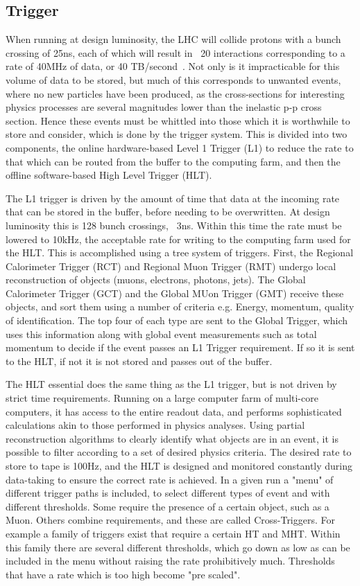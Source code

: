 \subsection{Trigger}
\label{sec:detrig}
When running at design luminosity, the LHC will collide protons with a bunch crossing of 25ns, each of which will result in ~20 interactions corresponding to a rate of 40MHz of data, or 40 TB/second~\cite{TRIGTDR}. Not only is it impracticable for this volume of data to be stored, but much of this corresponds to unwanted events, where no new particles have been produced, as the cross-sections for interesting physics processes are several magnitudes lower than the inelastic p-p cross section. Hence these events must be whittled into those which it is worthwhile to store and consider, which is done by the trigger system. This is divided into two components, the online hardware-based Level 1 Trigger (L1) to reduce the rate to that which can be routed from the buffer to the computing farm, and then the offline software-based High Level Trigger (HLT). 

The L1 trigger is driven by the amount of time that data at the incoming rate that can be stored in the buffer, before needing to be overwritten. At design luminosity this is 128 bunch crossings, ~3ns. Within this time the rate must be lowered to 10kHz, the acceptable rate for writing to the computing farm used for the HLT. This is accomplished using a tree system of triggers. First, the Regional Calorimeter Trigger (RCT) and Regional Muon Trigger (RMT) undergo local reconstruction of objects (muons, electrons, photons, jets). The Global Calorimeter Trigger (GCT) and the Global MUon Trigger (GMT) receive these objects, and sort them using a number of criteria e.g. Energy, momentum, quality of identification. The top four of each type are sent to the Global Trigger, which uses this information along with global event measurements such as total momentum to decide if the event passes an L1 Trigger requirement. If so it is sent to the HLT, if not it is not stored and passes out of the buffer. 

The HLT essential does the same thing as the L1 trigger, but is not driven by strict time requirements. Running on a large computer farm of multi-core computers, it has access to the entire readout data, and performs sophisticated calculations akin to those performed in physics analyses. Using partial reconstruction algorithms to clearly identify what objects are in an event, it is possible to filter according to a set of desired physics criteria.  The desired rate to store to tape is 100Hz, and the HLT is designed and monitored constantly during data-taking to ensure the correct rate is achieved. In a given run a "menu" of different trigger paths is included, to select different types of event and with different thresholds. Some require the presence of a certain object, such as a Muon. Others combine requirements, and these are called Cross-Triggers. For example a family of triggers exist that require a certain HT and MHT. Within this family there are several different thresholds, which go down as low as can be included in the menu without raising the rate prohibitively much. Thresholds that have a rate which is too high become "pre scaled".
